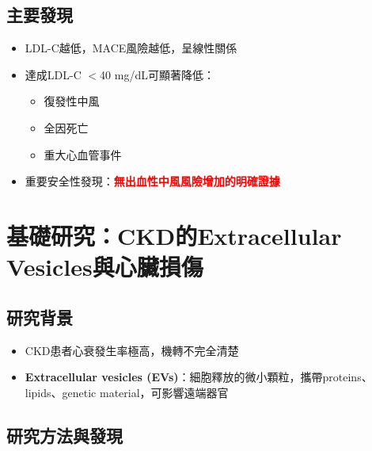 \documentclass[12pt,a4paper]{article}
\begin{document}
\subsection{主要發現}


\begin{itemize}
    \item LDL-C越低，MACE風險越低，呈線性關係
    \item 達成LDL-C $<$40 mg/dL可顯著降低：
    \begin{itemize}
        \item 復發性中風
        \item 全因死亡
        \item 重大心血管事件
    \end{itemize}
    \item 重要安全性發現：\textcolor{red}{\textbf{無出血性中風風險增加的明確證據}}
\end{itemize}


\section{基礎研究：CKD的Extracellular Vesicles與心臟損傷}

\subsection{研究背景}

\begin{itemize}
    \item CKD患者心衰發生率極高，機轉不完全清楚
    \item \textbf{Extracellular vesicles (EVs)}：細胞釋放的微小顆粒，攜帶proteins、lipids、genetic material，可影響遠端器官
\end{itemize}

\subsection{研究方法與發現}
\end{document}
